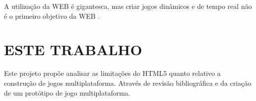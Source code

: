 \begin{draft}
A utilização da WEB é gigantesca, mas criar jogos
dinâmicos e de tempo real não é o primeiro objetivo da WEB
\autocite{html5mostwanted}.

\section{ESTE TRABALHO}

Este projeto propõe analisar as limitações do HTML5 quanto relativo
a construção de jogos multiplataforma. Através de revisão
bibliográfica e da criação de um protótipo de jogo multiplataforma.



\end{draft}

